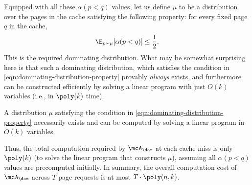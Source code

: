 Equipped with all these $\alpha(p<q)$ values, let us define $\mu$ to be a distribution over the pages in the cache satisfying the following property: for every fixed page $q$ in the cache,
\begin{align}
    \label{eqn:dominating-distribution-property}
    \E_{p \sim \mu}[\alpha(p<q)] \le \frac{1}{2}.
\end{align}
This is the required dominating distribution. What may be somewhat surprising here is that such a dominating distribution, which satisfies the condition in \eqref{eqn:dominating-distribution-property} provably \textit{always} exists, and furthermore can be constructed efficiently by solving a linear program with just $O(k)$ variables (i.e., in $\poly(k)$ time).
\begin{theorem}
    \label{thm:dominating-distribution-exists}
    A distribution $\mu$ satisfying the condition in \eqref{eqn:dominating-distribution-property} necessarily exists and can be computed by solving a linear program in $O(k)$ variables.
\end{theorem}
Thus, the total computation required by $\mcA_\dom$ at each cache miss is only $\poly(k)$ (to solve the linear program that constructs $\mu$), assuming all $\alpha(p<q)$ values are precomputed initially. In summary, the overall computation cost of $\mcA_\dom$ across $T$ page requests is at most $T \cdot \poly(n, k)$.

